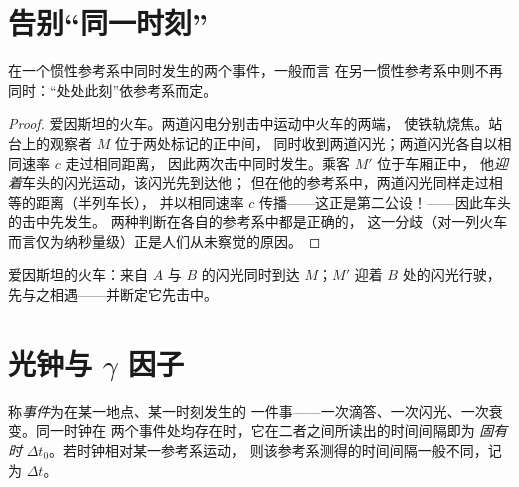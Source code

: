 \section{告别“同一时刻”}

\begin{proposition}[同时性的相对性]\label{prop:g12:special-relativity:simultaneity}
在一个惯性参考系中同时发生的两个事件，一般而言
在另一惯性参考系中则不再同时：“处处此刻”依参考系而定。
\end{proposition}

\begin{proof}
爱因斯坦的火车。两道闪电分别击中运动中火车的两端，
使铁轨烧焦。站台上的观察者 $M$ 位于两处标记的正中间，
同时收到两道闪光；两道闪光各自以相同速率 $c$ 走过相同距离，
因此两次击中同时发生。乘客 $M'$ 位于车厢正中，
他\emph{迎着}车头的闪光运动，该闪光先到达他；
但在他的参考系中，两道闪光同样走过相等的距离（半列车长），
并以相同速率 $c$ 传播——这正是第二公设！——因此车头的击中先发生。
两种判断在各自的参考系中都是正确的，
这一分歧（对一列火车而言仅为纳秒量级）正是人们从未察觉的原因。
\end{proof}

\begin{omfigure}

{\small 爱因斯坦的火车：来自 $A$ 与 $B$ 的闪光同时到达 $M$；$M'$
迎着 $B$ 处的闪光行驶，先与之相遇——并断定它先击中。}
\end{omfigure}

\section{光钟与 $\gamma$ 因子}

\begin{definition}[事件，固有时]\label{def:g12:special-relativity:proper-time}
称\emph{事件}为在某一地点、某一时刻发生的
一件事——一次滴答、一次闪光、一次衰变。同一时钟在
两个事件处均存在时，它在二者之间所读出的时间间隔即为
\emph{固有时} $\Delta t_0$。若时钟相对某一参考系运动，
则该参考系测得的时间间隔一般不同，记为 $\Delta t$。
\end{definition}

